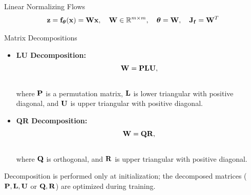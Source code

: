 \documentclass{beamer}
\begin{document}
\begin{frame}{Linear Normalizing Flows}
	\vspace{-0.3cm}
	\[
		\mathbf{z} = \mathbf{f}_{\boldsymbol{\theta}}(\mathbf{x}) = \mathbf{W} \mathbf{x}, \quad \mathbf{W} \in \mathbb{R}^{m \times m}, \quad \boldsymbol{\theta} = \mathbf{W}, \quad \mathbf{J}_{\mathbf{f}} = \mathbf{W}^T
	\]
	\vspace{-0.7cm}
	\eqpause
	\begin{block}{Matrix Decompositions}
		\begin{itemize}
			\item \textbf{LU Decomposition:}
			\vspace{-0.3cm}
			\[
				\mathbf{W} = \mathbf{P} \mathbf{L} \mathbf{U},
			\]
			\vspace{-0.7cm} \\
			where $\mathbf{P}$ is a permutation matrix, $\mathbf{L}$ is lower triangular with positive diagonal, and $\mathbf{U}$ is upper triangular with positive diagonal.
			\eqpause
			\item \textbf{QR Decomposition:}
			\vspace{-0.3cm}
			\[
				\mathbf{W} = \mathbf{Q} \mathbf{R},
			\]
			\vspace{-0.7cm} \\
			where $\mathbf{Q}$ is orthogonal, and $\mathbf{R}$ is upper triangular with positive diagonal.
		\end{itemize}
	\end{block}
    \eqpause
	Decomposition is performed only at initialization; the decomposed matrices ($\mathbf{P}, \mathbf{L}, \mathbf{U}$ or $\mathbf{Q}, \mathbf{R}$) are optimized during training.

\end{frame}
\end{document}

